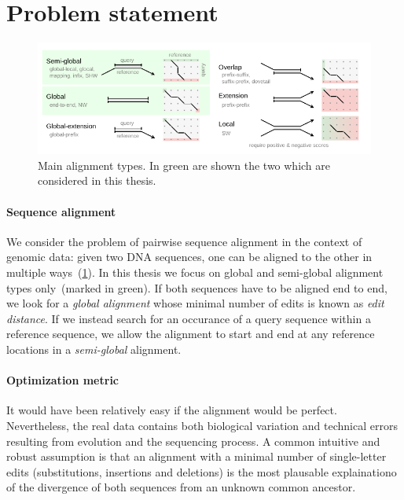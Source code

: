 \section*{Problem statement}

\begin{figure}[t]  %
    \includegraphics[width=\textwidth]{alignment-types-thesis.pdf}
	\caption[Main alignment types]{Main alignment types. In green are shown the two which are considered in this thesis.}
    \label{fig:alignment-types}
\end{figure}

\paragraph{Sequence alignment}
We consider the problem of pairwise sequence alignment in the context of genomic
data: given two DNA sequences, one can be aligned to the other in multiple
ways~(\cref{fig:alignment-types}). In this thesis we focus on global and
semi-global alignment types only~(marked in green). If both sequences have to be
aligned end to end, we look for a \emph{global alignment} whose minimal number
of edits is known as \emph{edit distance}. If we instead search for an occurance
of a query sequence within a reference sequence, we allow the alignment to start
and end at any reference locations in a \emph{semi-global} alignment.

\paragraph{Optimization metric}
It would have been relatively easy if the alignment would be perfect.
Nevertheless, the real data contains both biological variation and technical
errors resulting from evolution and the sequencing process. A common intuitive
and robust assumption is that an alignment with a minimal number of
single-letter edits (substitutions, insertions and deletions) is the most
plausable explainationo of the divergence of both sequences from an unknown
common ancestor.

